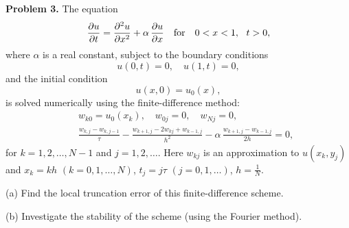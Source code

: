 \documentclass[10pt]{article}
\begin{document}
\vskip 0.5cm
\noindent
{\bf Problem 3.} The equation
\begin{equation}
\frac{\partial u}{\partial t}=\frac{\partial^{2}u}{\partial x^{2}}+\alpha \,
\frac{\partial u}{\partial x} \quad \hbox{for} \quad
0<x<1, \ \ t>0, \label{11}
\end{equation}
where $\alpha$ is a real constant, subject to the boundary conditions
\begin{equation}
u(0,t)=0, \quad u(1, t)=0,  \label{12}
\end{equation}
and the initial condition
\begin{equation}
u(x,0)=u_{0}(x),  \label{13}
\end{equation}
is solved numerically using the finite-difference method:
\begin{eqnarray}
&&w_{k0}=u_{0}(x_{k}), \quad w_{0j}=0, \quad w_{Nj}=0,   \nonumber \\
&&\frac{w_{k,j}-w_{k,j-1}}{\tau}-\frac{w_{k+1,j}-2w_{kj}+w_{k-1,j}}{h^{2}}
-\alpha \, \frac{w_{k+1,j}-w_{k-1,j}}{2h}=0,   \label{15}
\end{eqnarray}
for $k=1, 2, \dots , N-1$ and $j=1, 2, \dots$.
Here $w_{kj}$ is an approximation to $u(x_{k}, y_{j})$ and
$x_{k}=k h$ $(k=0,1,\dots,N)$, $t_{j}=j \tau$ $(j=0,1,\dots)$, $h=\frac{1}{N}$.

\vskip 0.2cm \noindent (a) Find the local truncation error of this 
finite-difference scheme.

\vskip 0.2cm \noindent (b) Investigate the stability of the scheme
(using the Fourier method).
\end{document}
